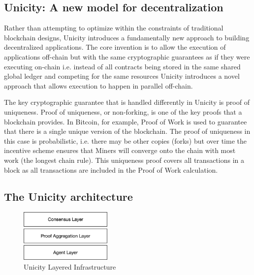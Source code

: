 \documentclass{article}
\begin{document}
\subsection{Unicity: A new model for decentralization}

Rather than attempting to optimize within the constraints of traditional blockchain designs, Unicity introduces a fundamentally new approach to building decentralized applications. The core invention is to allow the execution of applications off-chain but with the same cryptographic guarantees as if they were executing on-chain i.e. instead of all contracts being stored in the same shared global ledger and competing for the same resources Unicity introduces a novel approach that allows execution to happen in parallel off-chain.


The key cryptographic guarantee that is handled differently in Unicity is proof of uniqueness. Proof of uniqueness, or non-forking, is one of the key proofs that a blockchain provides. In Bitcoin, for example, Proof of Work is used to guarantee that there is a single unique version of the blockchain. The proof of uniqueness in this case is probabilistic, i.e. there may be other copies (forks) but over time the incentive scheme ensures that Miners will converge onto the chain with most work (the longest chain rule). This uniqueness proof covers all transactions in a block as all transactions are included in the Proof of Work calculation.

\subsection{The Unicity architecture}

\begin{figure}[htbp]
    \centering
    \includegraphics[width=0.4\textwidth]{ThreeLayers.png}
    \caption{Unicity Layered Infrastructure}
    \label{fig:layers}
\end{figure}
\end{document}

